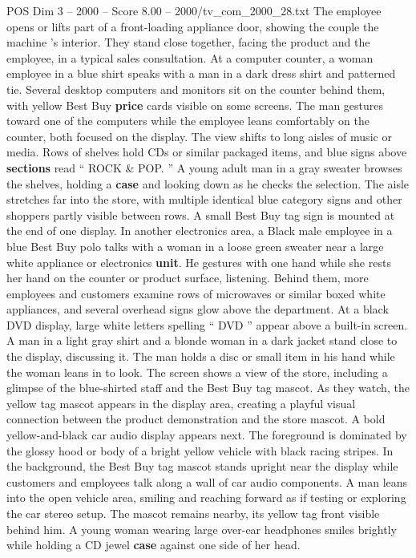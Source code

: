 \begin{textsample}{POS Dim 3 – 2000 – Score 8.00 – 2000/tv\_com\_2000\_28.txt}
The employee opens or lifts part of a front-loading appliance door, showing the couple the machine ’s interior.
They stand close together, facing the product and the employee, in a typical sales consultation.
At a computer counter, a woman employee in a blue shirt speaks with a man in a dark dress shirt and patterned tie.
Several desktop computers and monitors sit on the counter behind them, with yellow Best Buy \textbf{price} cards visible on some screens.
The man gestures toward one of the computers while the employee leans comfortably on the counter, both focused on the display.
The view shifts to long aisles of music or media.
Rows of shelves hold CDs or similar packaged items, and blue signs above \textbf{sections} read “ ROCK \& POP. ” A young adult man in a gray sweater browses the shelves, holding a \textbf{case} and looking down as he checks the selection.
The aisle stretches far into the store, with multiple identical blue category signs and other shoppers partly visible between rows.
A small Best Buy tag sign is mounted at the end of one display.
In another electronics area, a Black male employee in a blue Best Buy polo talks with a woman in a loose green sweater near a large white appliance or electronics \textbf{unit}.
He gestures with one hand while she rests her hand on the counter or product surface, listening.
Behind them, more employees and customers examine rows of microwaves or similar boxed white appliances, and several overhead signs glow above the department.
At a black DVD display, large white letters spelling “ DVD ” appear above a built-in screen.
A man in a light gray shirt and a blonde woman in a dark jacket stand close to the display, discussing it.
The man holds a disc or small item in his hand while the woman leans in to look.
The screen shows a view of the store, including a glimpse of the blue-shirted staff and the Best Buy tag mascot.
As they watch, the yellow tag mascot appears in the display area, creating a playful visual connection between the product demonstration and the store mascot.
A bold yellow-and-black car audio display appears next.
The foreground is dominated by the glossy hood or body of a bright yellow vehicle with black racing stripes.
In the background, the Best Buy tag mascot stands upright near the display while customers and employees talk along a wall of car audio components.
A man leans into the open vehicle area, smiling and reaching forward as if testing or exploring the car stereo setup.
The mascot remains nearby, its yellow tag front visible behind him.
A young woman wearing large over-ear headphones smiles brightly while holding a CD jewel \textbf{case} against one side of her head.

\end{textsample}
